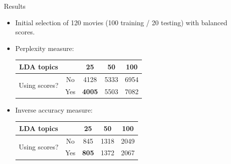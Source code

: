 \documentclass{beamer}
\begin{document}
\begin{frame}{Results}
	\begin{itemize}
	\item Initial selection of 120 movies (100 training / 20 testing) with balanced scores.
	\item Perplexity measure:
	
	\begin{center}
	\begin{tabular}{cc|ccc}
		LDA topics      & & 25 & 50 & 100 \\ \hline
		\multirow{2}{*}{Using scores?} & No  & 4128 & 5333 & 6954 \\
		                               & Yes & \textbf{4005} & 5503 & 7082 \\
	\end{tabular}
	\end{center}
	
	\item Inverse accuracy measure:
	
	\begin{center}
	\begin{tabular}{cc|ccc}
		LDA topics      & & 25 & 50 & 100 \\ \hline
		\multirow{2}{*}{Using scores?} & No  & 845 & 1318 & 2049 \\
		                               & Yes & \textbf{805} & 1372 & 2067 \\
	\end{tabular}
	\end{center}
	\end{itemize}
\end{frame}
\end{document}
